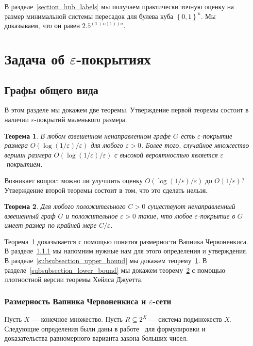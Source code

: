 \documentclass[12pt]{article}
\newcommand{\eps}{\varepsilon}
\newcommand{\set}[1]{\left\{#1\right\}}
\newcommand{\zo}{\set{0, 1}}
\DeclareRobustCommand*{\CC}{\,\textendash\,\hskip 0pt}
\newtheorem{theorem}{Теорема}
\begin{document}
    В разделе~\ref{section_hub_labels} мы получаем практически точную оценку на размер минимальной системы пересадок
    для булева куба $\zo^n$. Мы доказываем, что он равен $2.5^{(1 + o(1)) n}$.
    \section{Задача об $\eps$-покрытиях}
    \label{section_eps_covers}
    \subsection{Графы общего вида}
    \label{subsection_general_graphs}
    В этом разделе мы докажем две теоремы.
    Утверждение первой теоремы состоит в наличии $\eps$-покрытий маленького размера.
    \begin{theorem}
        \label{upper_bound}
        В любом взвешенном ненаправленном графе $G$ есть $\eps$-покрытие размера $O(\log(1 / \eps) / \eps)$ для
        любого $\eps > 0$. Более того, случайное множество вершин размера $O(\log(1 / \eps) / \eps)$ с высокой вероятностью
        является $\eps$-покрытием.
    \end{theorem}
    Возникает вопрос: можно ли улучшить оценку $O(\log(1 / \eps) / \eps)$ до $O(1 / \eps)$? Утверждение второй теоремы
    состоит в том, что это сделать нельзя.
    \begin{theorem}
        \label{lower_bound}
        Для любого положительного $C > 0$ существуют ненаправленный взвешенный граф $G$ и положительное $\eps > 0$
        такие, что любое $\eps$-покрытие в $G$ имеет размер по крайней мере $C / \eps$.
    \end{theorem}
    Теорема~\ref{upper_bound} доказывается с помощью понятия размерности Вапника\CC Червоненкиса. В
    разделе~\ref{subsubsection_vapnik_chervonenkis} мы напомним нужные нам для этого определения и утверждения.
    В разделе~\ref{subsubsection_upper_bound} мы докажем теорему~\ref{upper_bound}.
    В разделе~\ref{subsubsection_lower_bound} мы докажем теорему~\ref{lower_bound} с помощью
    плотностной версии теоремы Хейлса\CC Джуетта.
    \subsubsection{Размерность Вапника\CC Червоненкиса и $\eps$-сети}
    \label{subsubsection_vapnik_chervonenkis}

    Пусть $X$ --- конечное множество. Пусть $R \subseteq 2^X$ --- система подмножеств $X$.
    Следующие определения были даны в работе~\cite{VC71} для формулировки и доказательства равномерного варианта
    закона больших чисел.
\end{document}

